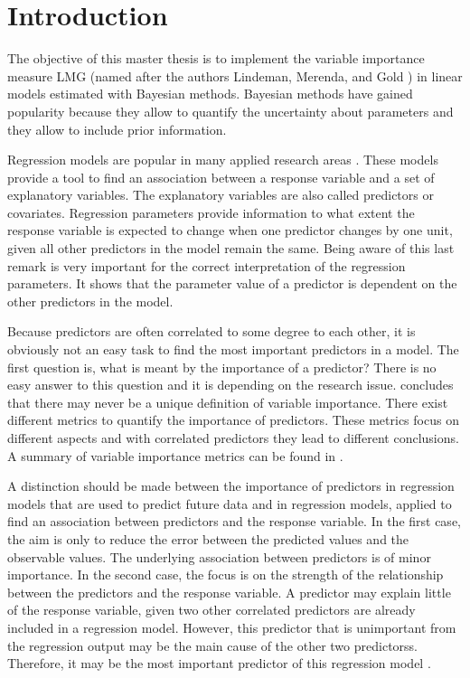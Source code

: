 \documentclass[11pt,a4paper,twoside]{book}
\begin{document}







\chapter{Introduction}

The objective of this master thesis is to implement the variable importance measure LMG (named after the authors Lindeman, Merenda, and Gold \citep{Gromping2007}) in linear models estimated with Bayesian methods. Bayesian methods have gained popularity because they allow to quantify the uncertainty about parameters and they allow to include prior information.

Regression models are popular in many applied research areas \citep{Nimon2013}. These models provide a tool to find an association between a response variable and a set of explanatory variables. The explanatory variables are also called predictors or covariates. Regression parameters provide information to what extent the response variable is expected to change when one predictor changes by one unit, given all other predictors in the model remain the same. Being aware of this last remark is very important for the correct interpretation of the regression parameters. It shows that the parameter value of a predictor is dependent on the other predictors in the model.

Because predictors are often correlated to some degree to each other, it is obviously not an easy task to find the most important predictors in a model. The first question is, what is meant by the importance of a predictor? There is no easy answer to this question and it is depending on the research issue. \cite{Gromping2015} concludes that there may never be a unique definition of variable importance. There exist different metrics to quantify the importance of predictors. These metrics focus on different aspects and with correlated predictors they lead to different conclusions.  A summary of variable importance metrics can be found in  \cite{Gromping2015}.  

A distinction should be made between the importance of predictors in regression models that are used to predict future data and in regression models, applied to find an association between predictors and the response variable. In the first case, the aim is only to reduce the error between the predicted values and the observable values. The underlying association between predictors is of minor importance. In the second case, the focus is on the strength of the relationship between the predictors and the response variable. A predictor may explain little of the response variable, given two other correlated predictors are already included in a regression model. However, this predictor that is unimportant from the regression output may be the main cause  of the other two predictorss. Therefore, it may be the most important predictor of this regression model \citep{Gromping2007}. 
\end{document}
